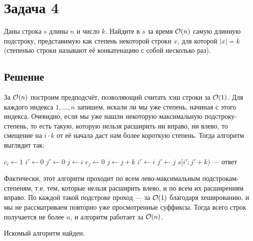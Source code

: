 \section{Задача 4}
Даны строка $s$ длины $n$ и число $k$. Найдите в $s$ за время $\mathcal{O}(n)$ самую длинную подстроку,
представимую как степень  некоторой строки $x$, для которой $|x| = k$ (степенью строки
называют её конкатенацию с собой несколько раз).

\subsection{Решение}
За $\mathcal{O}(n)$ построим предподсчёт, позволяющий считать хэш строки за $\mathcal{O}(1)$.
Для каждого индекса $1,\ldots,n$ запишем, искали ли мы уже степень, начиная с этого индекса.
Очевидно, если мы уже нашли некоторую максимальную подстроку-степень,
то есть такую, которую нельзя расширить ни вправо, ни влево,
то смещение на $i \cdot k$ от её начала
даст нам более короткую степень.
Тогда алгоритм выглядит так:
\begin{algorithmic}
        \State $c_i \gets 1$
    \EndFor
    \State $i' \gets 0$
    \State $j' \gets 0$
        \State $j \gets i$
        \While{$(c_j = 1) \land (j + k < n) \land (s[i ; i + k) = s[j ; j + k))$}
            \State $c_j \gets 0$
            \State $j \gets j + k$
        \EndWhile
            \State $i' \gets i$
            \State $j' \gets j$
        \EndIf
    \EndFor
    \State $s[i'; j' + k)$ --- ответ
\end{algorithmic}

Фактически, этот алгоритм проходит по всем
лево-максимальным подстрокам-степеням,
т.е. тем, которые нельзя расширить влево,
и по всем их расширениям вправо.
По каждой такой подстроке проход --- за $\mathcal{O}(1)$ благодаря хешированию,
и мы не рассматриваем повторно уже просмотренные суффиксы.
Тогда всего строк получается не более $n$,
и алгоритм работает за $\mathcal{O}(n)$.

Искомый алгоритм найден.
